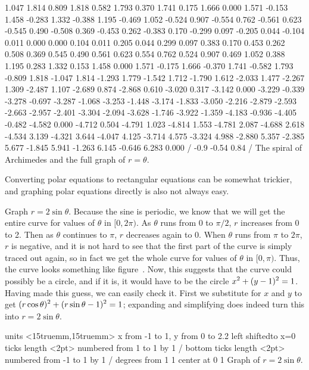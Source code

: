 {1.047 1.814 0.809 1.818 0.582 1.793 0.370 1.741 0.175 1.666
0.000 1.571 -0.153 1.458 -0.283 1.332 -0.388 1.195 -0.469 1.052
-0.524 0.907 -0.554 0.762 -0.561 0.623 -0.545 0.490 -0.508 0.369
-0.453 0.262 -0.383 0.170 -0.299 0.097 -0.205 0.044 -0.104 0.011
0.000 0.000 0.104 0.011 0.205 0.044 0.299 0.097 0.383 0.170
0.453 0.262 0.508 0.369 0.545 0.490 0.561 0.623 0.554 0.762
0.524 0.907 0.469 1.052 0.388 1.195 0.283 1.332 0.153 1.458
0.000 1.571 -0.175 1.666 -0.370 1.741 -0.582 1.793 -0.809 1.818
-1.047 1.814 -1.293 1.779 -1.542 1.712 -1.790 1.612 -2.033 1.477
-2.267 1.309 -2.487 1.107 -2.689 0.874 -2.868 0.610 -3.020 0.317
-3.142 0.000 -3.229 -0.339 -3.278 -0.697 -3.287 -1.068 -3.253 -1.448
-3.174 -1.833 -3.050 -2.216 -2.879 -2.593 -2.663 -2.957 -2.401 -3.304
-2.094 -3.628 -1.746 -3.922 -1.359 -4.183 -0.936 -4.405 -0.482 -4.582
0.000 -4.712 0.504 -4.791 1.023 -4.814 1.553 -4.781 2.087 -4.688
2.618 -4.534 3.139 -4.321 3.644 -4.047 4.125 -3.714 4.575 -3.324
4.988 -2.880 5.357 -2.385 5.677 -1.845 5.941 -1.263 6.145 -0.646
6.283 0.000 /
\setdashes <2pt>
\setlinear
{} -0.9 -0.54 0.84 /
\endpicture}
\endtexonly
{}
\begincaption
The spiral of Archimedes and the full graph of $r=\theta$.
\endcaption
\endfigure

Converting polar equations to rectangular equations can be somewhat
trickier, and graphing polar equations directly is also not always easy.

\example Graph $r=2\sin\theta$. Because the sine is periodic, we know
that we will get the entire curve for values of $\theta$ in
$[0,2\pi)$. As $\theta$ runs from 0 to $\pi/2$, $r$ increases from 0
to 2. Then as $\theta$ continues to $\pi$, $r$ decreases again to
0. When $\theta$ runs from $\pi$ to $2\pi$, $r$ is negative, and it
is not hard to see that the first part of the curve is simply traced
out again, so in fact we get the whole curve for values of $\theta$
in $[0,\pi)$. Thus, the curve looks something like
figure~. Now, this suggests
that the curve could possibly be a circle, and if it is, it would
have to be the circle $\displaystyle x^2+(y-1)^2=1$. Having made this guess, we
can easily check it. First we substitute for $x$ and $y$ to get
$\displaystyle (r\cos\theta)^2+(r\sin\theta-1)^2=1$; expanding and simplifying
does indeed turn this into $r=2\sin\theta$.
\endexample

\figure
\texonly
\vbox{\beginpicture
\normalgraphs
\ninepoint
\setcoordinatesystem units <15truemm,15truemm>
\setplotarea x from -1 to 1, y from 0 to 2.2
\axis left shiftedto x=0 ticks length <2pt> numbered from 1 to 1 by 1 /
\axis bottom ticks length <2pt> numbered from -1 to 1 by 1 /
 degrees from 1 1 center at 0 1
\endpicture}
\endtexonly
{}
\begincaption
Graph of $r=2\sin\theta$.
\endcaption
\endfigure

